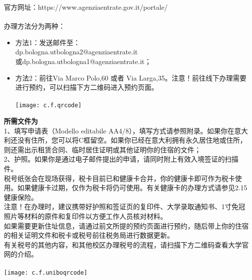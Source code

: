 官方网址：https://www.agenziaentrate.gov.it/portale/\\
\\
办理方法分为两种：
\begin{itemize}
\item 方法1：发送邮件至：\\
dp.bologna.utbologna2@agenziaentrate.it\\
或dp.bologna.utbologna1@agenziaentrate.it；
\item 方法2：前往Via Marco Polo,60 或者 Via Larga,35。注意！前往线下办理需要进行预约，可以扫描下方二维码进入预约页面。\\
\\
\texttt{[image: c.f.qrcode]}\\
\end{itemize}
\textbf{所需文件为}\\
1、填写申请表（Modello editabile AA4/8），填写方式请参照附录。如果你在意大利还没有住所，您可以将C框留空。如果你已经在意大利拥有永久居住地或住所，则还需出示租赁合同、临时居住证明或其他证明你的住宿的文件；\\
2、护照。如果你是通过电子邮件提出的申请，请同时附上有效入境签证的扫描件。
\\

税号纸张会在现场获得，税卡目前已和健康卡合并，你的健康卡即可作为税卡使用。如果健康卡过期，仅作为税卡将仍可使用。有关健康卡的办理方式请参见2.15 健康保险。\\
注意！在办理时，建议携带好护照和签证页的复印件、大学录取通知书、1寸免冠照片等材料的原件和复印件以方便工作人员核对材料。\\
如果需要更新住址信息，请通过前文所提的预约页面进行预约，随后带上你的住宿的相关证明文件和税卡或税号前往税务局进行数据更新。\\
有关税号的其他内容，和其他校区办理税号的流程，请扫描下方二维码查看大学官网的介绍。\\
\\
\texttt{[image: c.f.uniboqrcode]}\\
